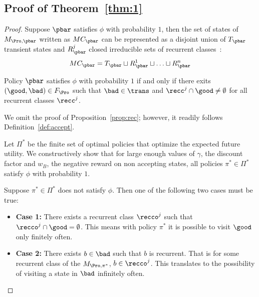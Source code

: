 \setlength\abovedisplayskip{3pt}
  \setlength\belowdisplayskip{3pt}
  \setlength\abovedisplayshortskip{3pt}
  \setlength\belowdisplayshortskip{3pt}
\subsection{Proof of Theorem~\ref{thm:1}}
\label{appendix}

\begin{proof}
Suppose $\pbar$ satisfies $\phi$ with probability $1$, then the set of states of $M_{\Pro, \pbar}$ written as $MC_{\pbar}$ can be represented as a disjoint union of $T_{\pbar}$ transient states and $R^j_{\pbar}$ closed irreducible sets of recurrent classes~\cite{Durrett2012}:
\begin{equation} 
MC_{\pbar} = T_{\pbar} \sqcup R_{\pbar}^1 \sqcup \dotsc \sqcup R_{\pbar}^n
\end{equation}


\begin{prop}
\label{prop:rec}
Policy $\pbar$ satisfies $\phi$ with probability $1$ if and only if there exits $(\good,\bad) \in F_\Pro$ such that $\bad \in \trans$ and $\recc^j \cap \good \neq  \emptyset$ for all recurrent classes $\recc^j$.
\end{prop}

We omit the proof of Proposition~\ref{prop:rec}; however, it readily follows Definition~\ref{def:accept}.


Let $\Pi^*$ be the finite set of optimal policies that optimize the expected future utility.  We constructively show that for large enough values of $\gamma$, the discount factor and $w_B$, the negative reward on non accepting states, all policies $\pi^* \in \Pi^*$ satisfy $\phi$ with probability $1$.



Suppose $\pi^* \in \Pi^*$ does not satisfy $\phi$. Then one of the following two cases must be true:

\begin{itemize}
\item {\bf Case 1:} There exists a recurrent class $\recco^j$ such that $\recco^j \cap \good = \emptyset$. This means with policy $\pi^*$ it is possible to visit $\good$ only finitely often.
\item {\bf Case 2:} There exists $b \in \bad$ such that $b$ is recurrent. That is for some recurrent class of the $M_{\Pro, \pi^*}$,  $b \in \recco^j$. This translates to the possibility of visiting a state in $\bad$ infinitely often.
\end{itemize}


\end{proof}
